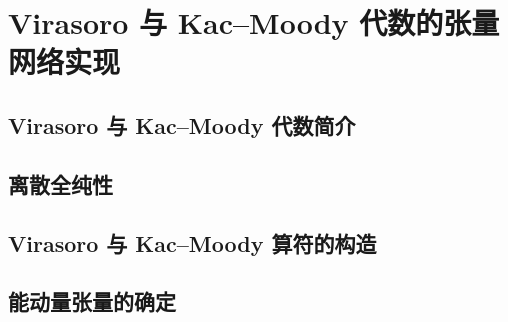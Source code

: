 \chapter{Virasoro 与 Kac--Moody 代数的张量网络实现}

\section{Virasoro 与 Kac--Moody 代数简介}

\section{离散全纯性}

\section{Virasoro 与 Kac--Moody 算符的构造}

\section{能动量张量的确定}
